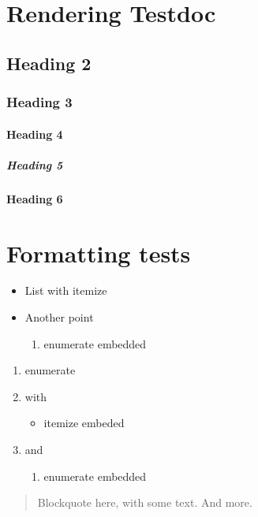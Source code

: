 \section*{Rendering Testdoc}

\subsection*{Heading 2}

\subsubsection*{Heading 3}

\paragraph*{Heading 4}

\subparagraph*{Heading 5}

\textbf{Heading 6}

\section*{Formatting tests}

\begin{itemize}
\item List with itemize
\item Another point
\begin{enumerate}
\item enumerate embedded
\end{enumerate}
\end{itemize}

\begin{enumerate}
\item enumerate
\item with
\begin{itemize}
\item itemize embeded
\end{itemize}
\item and
\begin{enumerate}
\item enumerate embedded
\end{enumerate}
\end{enumerate}

\begin{framed}
\begin{quote}
Blockquote here, with some text. And more.

\end{quote}
\end{framed}

